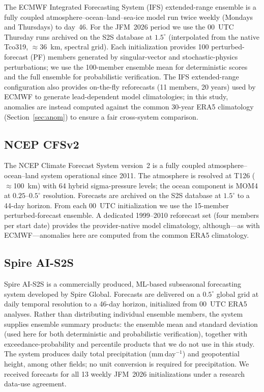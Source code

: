 \documentclass[11pt,a4paper]{article}
\begin{document}
The ECMWF Integrated Forecasting System (IFS) extended-range ensemble
\citep{vitart2014} is a fully coupled atmosphere--ocean--land--sea-ice
model run twice weekly (Mondays and Thursdays) to day~46. For the JFM~2026
period we use the 00~UTC Thursday runs archived on the S2S database
\citep{vitart2017} at $1.5^{\circ}$ (interpolated from the native Tco319,
$\approx$36~km, spectral grid). Each initialization provides 100
perturbed-forecast (PF) members generated by singular-vector and
stochastic-physics perturbations; we use the 100-member ensemble mean for
deterministic scores and the full ensemble for probabilistic verification.
The IFS extended-range configuration also provides on-the-fly reforecasts
(11 members, 20 years) used by ECMWF to generate lead-dependent model
climatologies; in this study, anomalies are instead computed against the
common 30-year ERA5 climatology (Section~\ref{sec:anom}) to ensure a fair
cross-system comparison.

\subsection{NCEP CFSv2}\label{sec:ncep}

The NCEP Climate Forecast System version~2 \citep{saha2014} is a fully
coupled atmosphere--ocean--land system operational since 2011. The
atmosphere is resolved at T126 ($\approx$100~km) with 64 hybrid sigma-pressure
levels; the ocean component is MOM4 at $0.25$--$0.5^{\circ}$ resolution.
Forecasts are archived on the S2S database \citep{vitart2017} at
$1.5^{\circ}$ to a 44-day horizon. From each 00~UTC initialization we use
the 15-member perturbed-forecast ensemble. A dedicated
1999--2010 reforecast set (four members per start date) provides the
provider-native model climatology, although---as with ECMWF---anomalies
here are computed from the common ERA5 climatology.

\subsection{Spire AI-S2S}\label{sec:spire}

Spire AI-S2S \citep{spire2026} is a commercially produced, ML-based
subseasonal forecasting system developed by Spire Global. Forecasts are
delivered on a $0.5^{\circ}$ global grid at daily temporal resolution to a
46-day horizon, initialized from 00~UTC ERA5 analyses. Rather than
distributing individual ensemble members, the system supplies ensemble
summary products: the ensemble mean and standard deviation (used here for
both deterministic and probabilistic verification), together with
exceedance-probability and percentile products that we do not use in this
study. The system produces daily total precipitation (mm\,day$^{-1}$) and
geopotential height, among other fields; no unit conversion is required for
precipitation. We received forecasts for all 13 weekly JFM~2026
initializations under a research data-use agreement.
\end{document}
